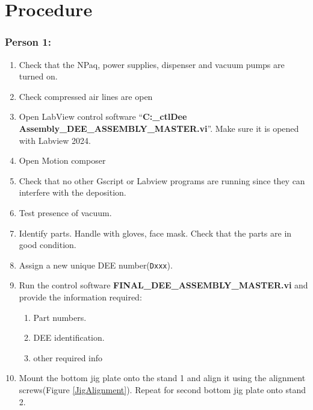 \documentclass[12pt]{cornelltfpxsop}
\begin{document}
\section{Procedure}
\begin{paracol}{2} %

\subsubsection*{Person 1:}

\begin{enumerate}
    \item Check that the NPaq, power supplies, dispenser and vacuum pumps are\\turned on.
    \item Check compressed air lines are open
    \item Open LabView control software ``\textbf{C:\Users{}_ctl\Documents\Timofei\Final Dee Assembly\Labview\FINAL_DEE_ASSEMBLY_MASTER.vi}''. Make sure it is opened with Labview 2024.
    \item Open Motion composer
    \item Check that no other Gscript or Labview programs are running since they can interfere with the deposition.
    \item Test presence of vacuum.        
    \item Identify parts. Handle with gloves, face mask. Check that the parts are in good condition.
    \item Assign a new unique DEE number(\texttt{Dxxx}).
    \item Run the control software \textbf{FINAL_DEE_ASSEMBLY_MASTER.vi} and provide the information required:
    \begin{enumerate}
        \item Part numbers.
        \item DEE identification.
        \item other required info
    \end{enumerate}
    \item Mount the bottom jig plate onto the stand 1 and align it using the alignment screws(Figure \ref{JigAlignment}). Repeat for second bottom jig plate onto stand 2.
    \begin{figure}
        \centering

\end{figure}
\end{enumerate}
\end{paracol}
\end{document}
